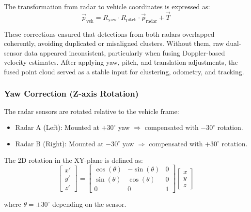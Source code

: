 The transformation from radar to vehicle coordinates is expressed as:
\begin{equation}
    \vec{p}_{\text{veh}} = R_{\text{yaw}} \cdot R_{\text{pitch}} \cdot \vec{p}_{\text{radar}} + \vec{T}
    \label{eq:radar_to_vehicle_transform_short}
\end{equation}

These corrections ensured that detections from both radars overlapped coherently, avoiding duplicated or misaligned clusters.  
Without them, raw dual-sensor data appeared inconsistent, particularly when fusing Doppler-based velocity estimates.  
After applying yaw, pitch, and translation adjustments, the fused point cloud served as a stable input for clustering, odometry, and tracking.

\vspace{0.5em}
\subsubsection{Yaw Correction (Z-axis Rotation)}
The radar sensors are rotated relative to the vehicle frame:

\begin{itemize}
    \item Radar A (Left): Mounted at $+30^\circ$ yaw $\Rightarrow$ compensated with $-30^\circ$ rotation.
    \item Radar B (Right): Mounted at $-30^\circ$ yaw $\Rightarrow$ compensated with $+30^\circ$ rotation.
\end{itemize}

The 2D rotation in the XY-plane is defined as:
\[
\begin{bmatrix}
x' \\
y' \\
z'
\end{bmatrix}
=
\begin{bmatrix}
\cos(\theta) & -\sin(\theta) & 0 \\
\sin(\theta) & \cos(\theta) & 0 \\
0 & 0 & 1
\end{bmatrix}
\begin{bmatrix}
x \\
y \\
z
\end{bmatrix}
\]

where $\theta = \pm30^\circ$ depending on the sensor.

